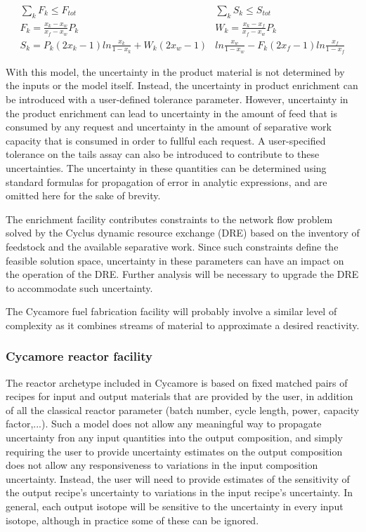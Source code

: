 \documentclass[dvips,12pt]{article}
\begin{document}
\begin{align*}
  \sum_k{F_k} \leq F_{tot}\qquad\qquad
  &\sum_k{S_k} \leq S_{tot}\\
  F_k = \frac{x_k - x_w}{x_f - x_w} P_k\qquad\qquad\qquad
  &W_k = \frac{x_k - x_f}{x_f - x_w} P_k\\
  S_k =  P_k\left(2x_k-1\right)ln\frac{x_k}{1-x_k}
         +W_k\left(2x_w-1\right)&ln\frac{x_w}{1-x_w}  
         -F_k\left(2x_f-1\right)ln\frac{x_f}{1-x_f}
\end{align*}

With this model, the uncertainty in the product
material is not determined by the inputs or the
model itself.  Instead, the uncertainty in product
enrichment can be introduced with a user-defined
tolerance parameter.  However, uncertainty in
the product enrichment can lead to uncertainty in
the amount of feed that is consumed by any request
and uncertainty in the amount of separative work
capacity that is consumed in order to fullful each
request.  A user-specified tolerance on the tails
assay can also be introduced to contribute to
these uncertainties.  The uncertainty in these 
quantities can be determined using standard
formulas for propagation of error in analytic
expressions, and are omitted here for the sake of 
brevity.

The enrichment facility contributes constraints to
the network flow problem solved by the Cyclus
dynamic resource exchange (DRE) based on the
inventory of feedstock and the available
separative work.  Since such constraints define
the feasible solution space, uncertainty in these
parameters can have an impact on the operation of
the DRE.  Further analysis will be necessary to
upgrade the DRE to accommodate such uncertainty.

The Cycamore fuel fabrication facility will
probably involve a similar level of complexity as
it combines streams of material to approximate a
desired reactivity.

\subsubsection{Cycamore reactor facility}

The reactor archetype included in Cycamore is
based on fixed matched pairs of recipes for input
and output materials that are provided by the
user, in addition of all the classical reactor
parameter (batch number, cycle length, power,
capacity factor,...).  Such a model does not allow
any meaningful way to propagate uncertainty fron
any input quantities into the output composition,
and simply requiring the user to provide uncertainty 
estimates on the output composition does not allow
any responsiveness to variations in the input
composition uncertainty.
Instead, the user will need to provide estimates
of the sensitivity of the output recipe's uncertainty to
variations in the input recipe's uncertainty.  In general, each
output isotope will be sensitive to the
uncertainty in every input isotope, although in
practice some of these can be ignored.
\end{document}
